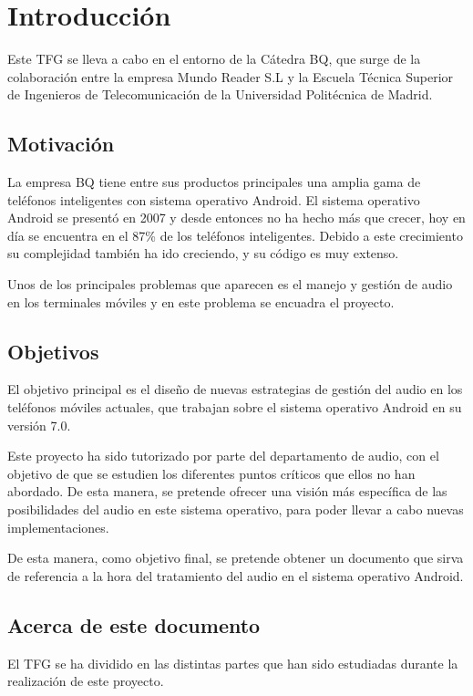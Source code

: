 \chapter{Introducción}
Este \gls{TFG} se lleva a cabo en el entorno de la Cátedra BQ, que surge de la colaboración entre la empresa Mundo Reader S.L y la Escuela Técnica Superior de Ingenieros de Telecomunicación de la Universidad Politécnica de Madrid.

\section{Motivación}
La empresa BQ tiene entre sus productos principales una amplia gama de teléfonos inteligentes con sistema operativo Android. El sistema operativo Android se presentó en 2007 y desde entonces no ha hecho más que crecer, hoy en día se encuentra en el 87\% de los teléfonos inteligentes. Debido a este crecimiento su complejidad también ha ido creciendo, y su código es muy extenso.

Unos de los principales problemas que aparecen es el manejo y gestión de audio en los terminales móviles y en este problema se encuadra el proyecto.

\section{Objetivos}
El objetivo principal es el diseño de nuevas estrategias de gestión del audio en los teléfonos móviles actuales, que trabajan sobre el sistema operativo Android en su versión 7.0.

Este proyecto ha sido tutorizado por parte del departamento de audio, con el objetivo de que se estudien los diferentes puntos críticos que ellos no han abordado. De esta manera, se pretende ofrecer una visión más específica de las posibilidades del audio en este sistema operativo, para poder llevar a cabo nuevas implementaciones.

De esta manera, como objetivo final, se pretende obtener un documento que sirva de referencia a la hora del tratamiento del audio en el sistema operativo Android.

\section{Acerca de este documento}
El \gls{TFG} se ha dividido en las distintas partes que han sido estudiadas durante la realización de este proyecto.

